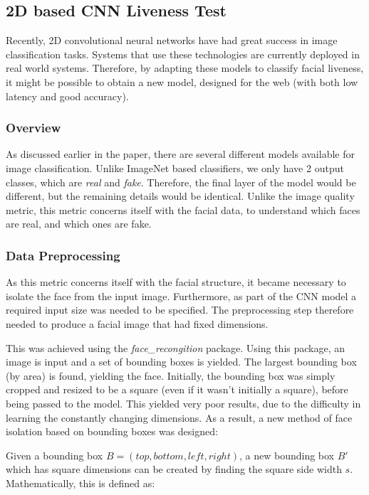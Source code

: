 \documentclass[10pt,a4paper]{article}
\begin{document}
            
        \subsection{2D based CNN Liveness Test}
        Recently, 2D convolutional neural networks have had great success in image classification tasks. Systems that use these technologies are currently deployed in real world systems.
        Therefore, by adapting these models to classify facial liveness, it might be possible to obtain a new model, designed for the web (with both low latency and good accuracy).
        
            \subsubsection{Overview}
                As discussed earlier in the paper, there are several different models available for image classification. Unlike ImageNet based classifiers, we only have 2 output classes, which are \emph{real} and \emph{fake}.
                Therefore, the final layer of the model would be different, but the remaining details would be identical. Unlike the image quality metric, this metric concerns itself with the facial data, to understand which faces
                are real, and which ones are fake.

            \subsubsection{Data Preprocessing}
                As this metric concerns itself with the facial structure, it became necessary to isolate the face from the input image. Furthermore, as part of the CNN model a required input size was needed to be specified. 
                The preprocessing step therefore needed to produce a facial image that had fixed dimensions.

                This was achieved using the \emph{face\_recongition} package. Using this package, an image is input and a set of bounding boxes is yielded. The largest bounding box (by area) is found,
                yielding the face. Initially, the bounding box was simply cropped and resized to be a square (even if it wasn't initially a square), before being passed to the model. This yielded very poor results,
                due to the difficulty in learning the constantly changing dimensions. As a result, a new method of face isolation based on bounding boxes was designed:

                Given a bounding box $B = (top, bottom, left, right)$, a new bounding box $B'$ which has square dimensions can be created by finding the square
                side width $s$. Mathematically, this is defined as:
\end{document}
